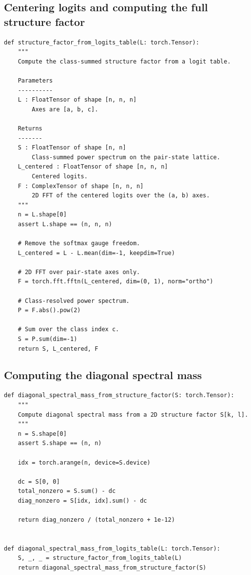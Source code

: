 \documentclass[11pt]{article}
\begin{document}
\subsection{Centering logits and computing the full structure factor}

\begin{lstlisting}[style=pythonstyle]
def structure_factor_from_logits_table(L: torch.Tensor):
    """
    Compute the class-summed structure factor from a logit table.

    Parameters
    ----------
    L : FloatTensor of shape [n, n, n]
        Axes are [a, b, c].

    Returns
    -------
    S : FloatTensor of shape [n, n]
        Class-summed power spectrum on the pair-state lattice.
    L_centered : FloatTensor of shape [n, n, n]
        Centered logits.
    F : ComplexTensor of shape [n, n, n]
        2D FFT of the centered logits over the (a, b) axes.
    """
    n = L.shape[0]
    assert L.shape == (n, n, n)

    # Remove the softmax gauge freedom.
    L_centered = L - L.mean(dim=-1, keepdim=True)

    # 2D FFT over pair-state axes only.
    F = torch.fft.fftn(L_centered, dim=(0, 1), norm="ortho")

    # Class-resolved power spectrum.
    P = F.abs().pow(2)

    # Sum over the class index c.
    S = P.sum(dim=-1)
    return S, L_centered, F
\end{lstlisting}

\subsection{Computing the diagonal spectral mass}

\begin{lstlisting}[style=pythonstyle]
def diagonal_spectral_mass_from_structure_factor(S: torch.Tensor):
    """
    Compute diagonal spectral mass from a 2D structure factor S[k, l].
    """
    n = S.shape[0]
    assert S.shape == (n, n)

    idx = torch.arange(n, device=S.device)

    dc = S[0, 0]
    total_nonzero = S.sum() - dc
    diag_nonzero = S[idx, idx].sum() - dc

    return diag_nonzero / (total_nonzero + 1e-12)


def diagonal_spectral_mass_from_logits_table(L: torch.Tensor):
    S, _, _ = structure_factor_from_logits_table(L)
    return diagonal_spectral_mass_from_structure_factor(S)
\end{lstlisting}
\end{document}
